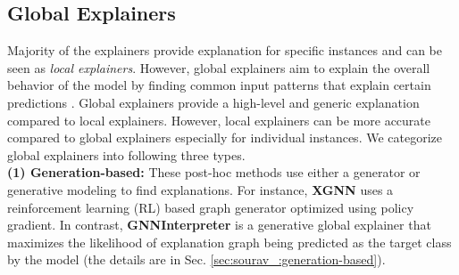 \subsection{Global Explainers}
\label{sec:sourav_:global}
Majority of the explainers provide explanation for specific instances and can be seen as \textit{local explainers}. However, global explainers aim to explain the overall behavior of the model by finding common input patterns that explain certain predictions \cite{xgnn}. Global explainers provide a high-level and generic explanation compared to local explainers. However, local explainers can be more accurate compared to global explainers \cite{xgnn} especially for individual instances. We categorize global explainers into following three types.\\
\noindent
\textbf{(1) Generation-based:} These post-hoc methods use either a generator or generative modeling to find explanations. For instance, \textbf{XGNN} \cite{xgnn} uses a reinforcement learning (RL) based graph generator optimized using policy gradient. In contrast, \textbf{GNNInterpreter} \cite{gnninterpreter} is a generative global explainer that maximizes the likelihood of explanation graph being predicted as the target class by the model (the details are in Sec. \ref{sec:sourav_:generation-based}).\\
